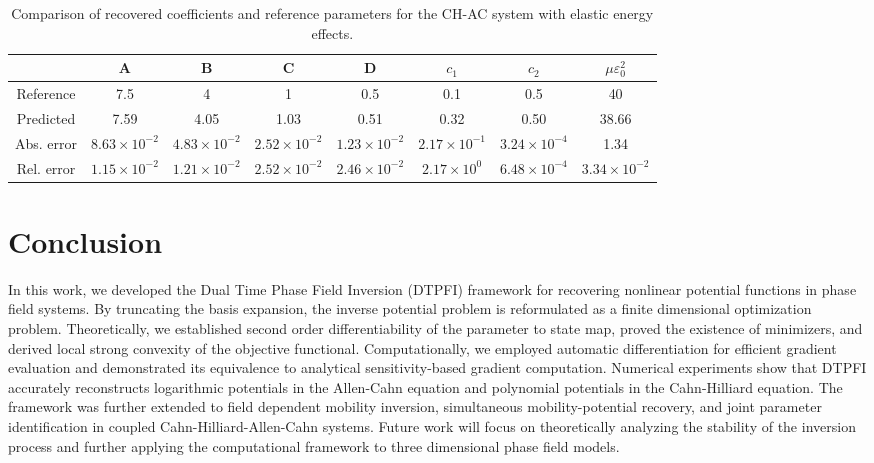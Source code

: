 \documentclass[11pt,reqno]{amsart}
\begin{document}
\begin{table}[htbp]
  \centering
  
  \caption{Comparison of recovered coefficients and reference parameters for the CH-AC system with elastic energy effects.}
  \footnotesize
  \begin{tabular}{c *{6}{c} c} 
    \toprule
    & {A} & {B} & {C} & {D} & {$c_1$} & {$c_2$} & {$\mu\varepsilon_0^2$} \\
    \midrule
    Reference    & 7.5    & 4      & 1      & 0.5    & 0.1    & 0.5   & 40 \\
    Predicted    & 7.59   & 4.05   & 1.03   & 0.51   & 0.32   & 0.50  & 38.66 \\
    \midrule
    Abs. error   & $8.63 \times 10^{-2}$ & $4.83 \times 10^{-2}$ & $2.52 \times 10^{-2}$ & $1.23 \times 10^{-2}$ & $2.17 \times 10^{-1}$ & $3.24 \times 10^{-4}$ & 1.34 \\
    Rel. error   & $1.15 \times 10^{-2}$ & $1.21 \times 10^{-2}$ & $2.52 \times 10^{-2}$ & $2.46 \times 10^{-2}$ & $2.17 \times 10^{0}$ & $6.48 \times 10^{-4}$ & $3.34 \times 10^{-2}$ \\
    \bottomrule
  \end{tabular}
  
      \label{tab:ACCH2D}
\end{table}
\section{Conclusion}
In this work, we developed the Dual Time Phase Field Inversion (DTPFI) framework for recovering nonlinear potential functions in phase field systems. By truncating the basis expansion, the inverse potential problem is reformulated as a finite dimensional optimization problem. Theoretically, we established second order differentiability of the parameter to state map, proved the existence of minimizers, and derived local strong convexity of the objective functional. Computationally, we employed automatic differentiation for efficient gradient evaluation and demonstrated its equivalence to analytical sensitivity-based gradient computation. Numerical experiments show that DTPFI accurately reconstructs logarithmic potentials in the Allen-Cahn equation and polynomial potentials in the Cahn-Hilliard equation. The framework was further extended to field dependent mobility inversion, simultaneous mobility-potential recovery, and joint parameter identification in coupled Cahn-Hilliard-Allen-Cahn systems. Future work will focus on theoretically analyzing the stability of the inversion process and further applying the computational framework to three dimensional phase field models.

 
 
\end{document}
